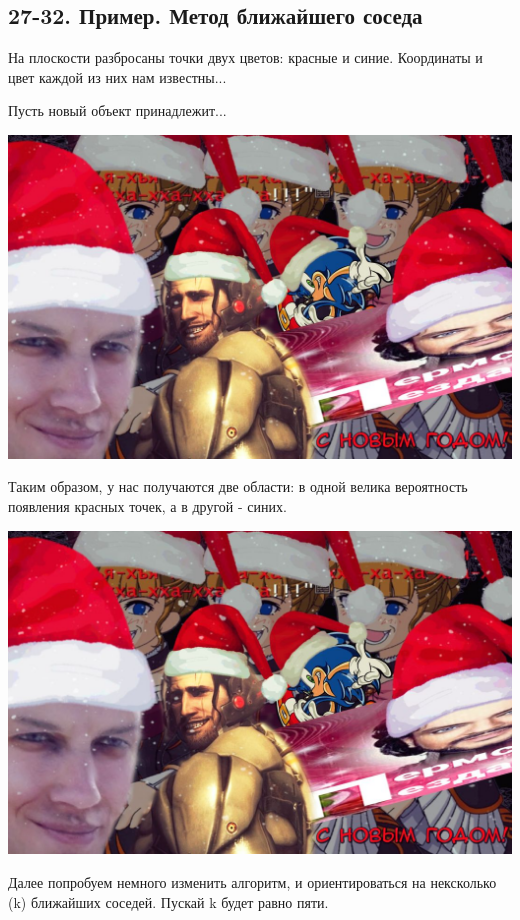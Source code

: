 \subsection{27-32. Пример. Метод ближайшего соседа}

На плоскости разбросаны точки двух цветов: красные и синие.
Координаты и цвет каждой из них нам известны...

Пусть новый объект принадлежит...

\includegraphics[scale=0.3]{figures/samplefigure.jpg}

Таким образом, у нас получаются две области: в одной велика вероятность
появления красных точек, а в другой - синих.

\includegraphics[scale=0.3]{figures/samplefigure.jpg}

Далее попробуем немного изменить алгоритм, и ориентироваться на
нексколько (k) ближайших соседей.
Пускай k будет равно пяти.

